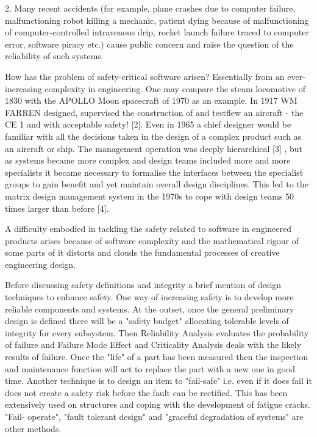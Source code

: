 2.       Many recent accidents (for example, plane crashes due to computer failure, malfunctioning robot killing a mechanic, patient dying because of malfunctioning of computer-controlled intravenous drip, rocket launch failure traced to computer error, software piracy etc.) cause public concern and raise the question of the reliability of such systems.


How has the problem of safety-critical software arisen? Essentially from an ever-increasing complexity in engineering. One may compare the steam locomotive of 1830 with the APOLLO Moon spacecraft of 1970 as an example. In 1917 WM FARREN designed, supervised the construction of and testflew an aircraft - the CE 1 and with acceptable safety! [2]. Even in 1965 a chief designer would be familiar with all the decisions taken in the design of a complex product such as an aircraft or ship. The management operation was deeply hierarchical [3] , but as systems became more complex and design teams included more and more specialists it became necessary to formalise the interfaces between the specialist groups to gain benefit and yet maintain overall design disciplines. This led to the matrix design management system in the 1970s to cope with design teams 50 times larger than before [4].

A difficulty embodied in tackling the safety related to software in engineered products arises because of software complexity and the mathematical rigour of some parts of it distorts and clouds the fundamental processes of creative engineering design. 

Before discussing safety definitions and integrity a brief mention of design techniques to enhance safety. One way of increasing safety is to develop more reliable components and systems. At the outset, once the general preliminary design is defined there will be a "safety budget" allocating tolerable levels of integrity for every subsystem. Then Reliability Analysis evaluates the probability of failure and Failure Mode Effect and Criticality Analysis deals with the likely results of failure. Once the "life" of a part has been measured then the inspection and maintenance function will act to replace the part with a new one in good time. Another technique is to design an item to "fail-safe" i.e. even if it does fail it does not create a safety risk before the fault can be rectified. This has been extensively used on structures and coping with the development of fatigue cracks. "Fail- operate", "fault tolerant design" and "graceful degradation of systems" are other methods.


